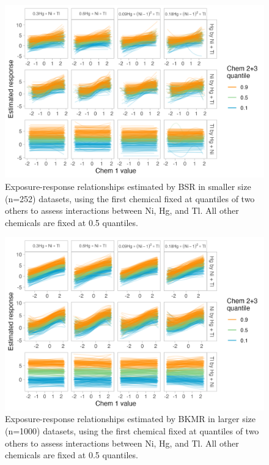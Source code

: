 \documentclass[12pt, twoside]{amherstthesis}
\begin{document}
\begin{figure}

{\centering \includegraphics[width=0.8\linewidth]{figures/ch4_ssm_triv_expresp} 

}

\caption{Exposure-response relationships estimated by BSR in smaller size (n=252) datasets, using the first chemical fixed at quantiles of two others to assess interactions between Ni, Hg, and Tl. All other chemicals are fixed at 0.5 quantiles.}\label{fig:ssmtri}
\end{figure}
\begin{figure}

{\centering \includegraphics[width=0.8\linewidth]{figures/ch4_klg_triv_expresp} 

}

\caption{Exposure-response relationships estimated by BKMR in larger size (n=1000) datasets, using the first chemical fixed at quantiles of two others to assess interactions between Ni, Hg, and Tl. All other chemicals are fixed at 0.5 quantiles.}\label{fig:klgtri}
\end{figure}
\end{document}
